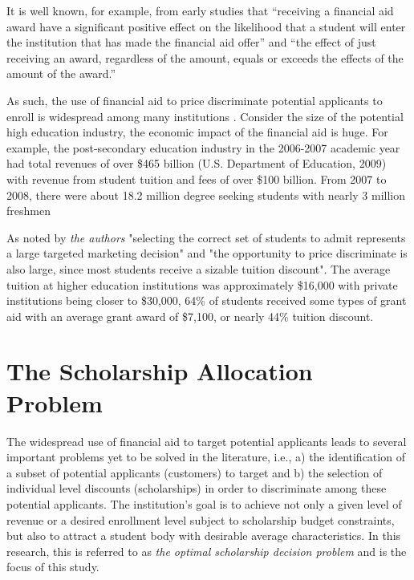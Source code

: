 \documentclass[12pt,english]{report}
\begin{document}
It is well known, for example, from early studies \citep{Heller1997,
Leslie1988} that ``receiving a financial aid award have a significant positive
effect on the likelihood that a student will enter the institution that has
made the financial aid offer'' and ``the effect of just receiving an award,
regardless of the amount, equals or exceeds the effects of the amount of the
award.''

As such, the use of financial aid to price discriminate potential applicants to
enroll is widespread among many institutions .   Consider the size of the
potential high education industry, the economic impact of the financial aid is
huge.    For example, the post-secondary education industry in the 2006-2007
academic year had total revenues of over \$465 billion (U.S. Department of
Education, 2009) with revenue from student tuition and fees of over \$100
billion.  From 2007 to 2008, there were about 18.2 million degree seeking
students with nearly 3 million freshmen\citep{Belloni2012}

As noted by \textit{the authors}  "selecting the correct set of students to
admit represents a large targeted marketing decision" and "the opportunity to
price discriminate is also large, since most students receive a sizable tuition
discount".  The average tuition at higher education institutions was
approximately \$16,000 with private institutions being closer to \$30,000, 64\%
of students received some types of grant aid with an average grant award of
\$7,100, or nearly 44\% tuition discount.

\section{The Scholarship Allocation Problem}
The widespread use of financial aid to target potential applicants leads to
several important problems yet to be solved in the literature, i.e., a) the
identification of a subset of potential applicants (customers) to target and b)
the selection of individual level discounts (scholarships) in order to
discriminate among these potential applicants.  The institution's goal is to
achieve not only a given level of revenue  or a desired enrollment level
subject to scholarship budget constraints, but also to attract a student body
with desirable average characteristics. In this research, this is referred to
as \textit{the optimal scholarship decision problem} and is the focus of this
study.
\end{document}
